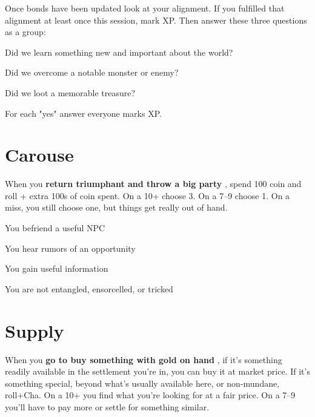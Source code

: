  

Once bonds have been updated look at your alignment. If you fulfilled that alignment at least once this session, mark XP. Then answer these three questions as a group:

 
\startitemize[1,packed]

\item Did we learn something new and important about the world?

 
\item Did we overcome a notable monster or enemy?

 
\item Did we loot a memorable treasure?


\stopitemize
 

For each "yes" answer everyone marks XP.



 


\section{Carouse}   
 

When you {\bf return triumphant and throw a big party} , spend 100 coin and roll + extra 100s of coin spent. On a 10+ choose 3. On a 7–9 choose 1. On a miss, you still choose one, but things get really out of hand.

 
\startitemize[1,packed]

\item You befriend a useful NPC

 
\item You hear rumors of an opportunity

 
\item You gain useful information

 
\item You are not entangled, ensorcelled, or tricked


\stopitemize
 
\section{Supply}   
 

When you {\bf go to buy something with gold on hand} , if it's something readily available in the settlement you're in, you can buy it at market price. If it's something special, beyond what's usually available here, or non-mundane, roll+Cha. On a 10+ you find what you're looking for at a fair price. On a 7–9 you'll have to pay more or settle for something similar.

